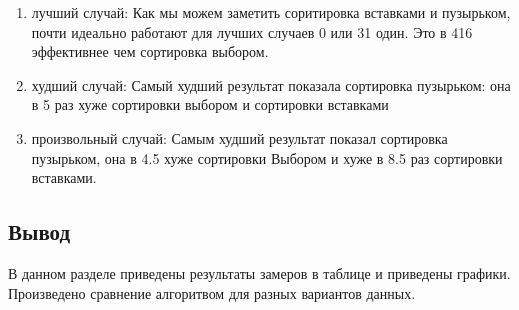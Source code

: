 	
	
	

	\begin{enumerate}
		\item лучший случай: Как мы можем заметить соритировка вставками и пузырьком, почти идеально работают для лучших случаев 0 или 31 один. Это в 416 эффективнее чем сортировка выбором.
		\item худший случай: Самый худший результат показала сортировка пузырьком: она в 5 раз хуже сортировки выбором и сортировки вставками
		\item произвольный случай: Самым худший результат показал сортировка пузырьком, она в 4.5 хуже сортировки Выбором и хуже в 8.5 раз сортировки вставками.
		
	\end{enumerate}
	
\subsection{Вывод}

	В данном разделе приведены результаты замеров в таблице и приведены графики. Произведено сравнение алгоритвом для разных вариантов данных.
	
	
	
	  
	